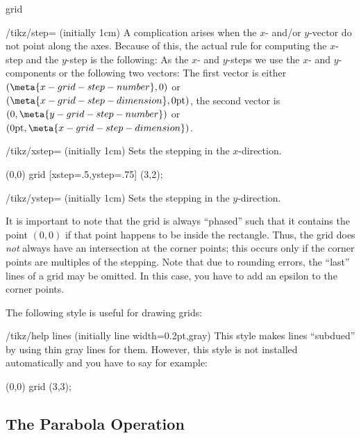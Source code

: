 \begin{pathoperation}{grid}{}
\begin{key}{/tikz/step= (initially 1cm)}
        A complication arises when the $x$- and/or $y$-vector do not point
        along the axes. Because of this, the actual rule for computing the
        $x$-step and the $y$-step is the following: As the $x$- and $y$-steps
        we use the $x$- and $y$-components or the following two vectors: The
        first vector is either $(\meta{x-grid-step-number},0)$ or
        $(\meta{x-grid-step-dimension},0\mathrm{pt})$, the second vector is
        $(0,\meta{y-grid-step-number})$ or
        $(0\mathrm{pt},\meta{x-grid-step-dimension})$.
    \end{key}

    \begin{key}{/tikz/xstep= (initially 1cm)}
        Sets the stepping in the $x$-direction.
\begin{codeexample}[]
\tikz \draw (0,0) grid [xstep=.5,ystep=.75] (3,2);
\end{codeexample}
    \end{key}

    \begin{key}{/tikz/ystep= (initially 1cm)}
        Sets the stepping in the $y$-direction.
    \end{key}

    It is important to note that the grid is always ``phased'' such that it
    contains the point $(0,0)$ if that point happens to be inside the
    rectangle. Thus, the grid does \emph{not} always have an intersection at
    the corner points; this occurs only if the corner points are multiples of
    the stepping. Note that due to rounding errors, the ``last'' lines of a
    grid may be omitted. In this case, you have to add an epsilon to the corner
    points.

    The following style is useful for drawing grids:
    \begin{stylekey}{/tikz/help lines (initially {line width=0.2pt,gray})}
        This style makes lines ``subdued'' by using thin gray lines for them.
        However, this style is not installed automatically and you have to say
        for example:
\begin{codeexample}[]
\tikz {} (0,0) grid (3,3);
\end{codeexample}
    \end{stylekey}
\end{pathoperation}


\subsection{The Parabola Operation}

